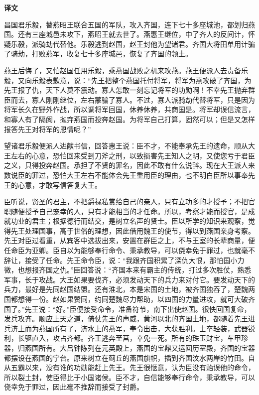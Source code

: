 \documentclass[12pt,UTF-8,openany,a4]{ctexbook}
\begin{document}
\newpage

\begin{Large}
    \noindent\textbf{译文}
\end{Large}


\vspace{1em}

\begin{large}
    \yiwen 
    昌国君乐毅，替燕昭王联合五国的军队，攻入齐国，连下七十多座城池，都划归燕国。还有三座城邑未攻下，燕昭王就去世了。燕惠王继位，中了齐人的反间计，怀疑乐毅，派骑劫代替他。乐毅逃到赵国，赵王封他为望诸君。齐国大将田单用计骗了骑劫，打败燕军，收复七十多座城邑，恢复了齐国的领土。
    
    燕王后悔了，又怕赵国任用乐毅，乘燕国战败之机来攻燕。燕王便派人去责备乐毅，又向乐毅表歉意，说：“先王把整个燕国托付将军，将军为燕攻破了齐国，为先王报了仇，天下人莫不震动。寡人怎敢一刻忘记将军的功勋啊！不幸先王抛弃群臣而去，寡人刚刚继位，左右蒙骗了寡人。不过，寡人派骑劫代替将军，只是因为将军长久在野外作战，所以调将军回国，休养休养，共商国是。将军却误信流言，和寡人有了隔阂，抛弃燕国而投奔赵国。为将军自己打算，固然可以；但是又怎样报答先王对将军的恩情呢？”
    
    望诸君乐毅便派人进献书信，回答惠王说：臣不才，不能奉承先王的遗命，顺从大王左右的心意，恐怕回来受到刀斧之刑，以致损害先王知人之明，又使您亏于君臣之义，只得投奔赵国。承担了不贤的罪名，因此不敢有什么说辞。现在大王派人来数说臣的罪过，恐怕大王左右不能体会先王重用臣的理由，也不明白臣所以事奉先王的心意，才敢写信答复大王。
    
    臣听说，贤圣的君主，不把爵禄私赏给自己的亲人，只有立功多的才授予；不把官职随便授予自己宠幸的人，只有才能相当的才任命。所以，考察才能而授官，是成就功业的君主；根据德行而结交，是树立名声的贤士。臣以所学的知识来观察，觉得先王处理国事，高于世俗的理想，因此借用魏王的使节，得以到燕国亲身考察。先王对臣过看重，从宾客中选拔出来，安置在群臣之上，不与王室的长辈商量，便任命臣为亚卿。臣自以为能够奉行命令、秉承教导，可以侥幸免于罪过，也就毫不辞让，接受了任命。先王命令臣，说：“我跟齐国积累了深仇大恨，那怕国小力微，也想报齐国之仇。”臣回答说：“齐国本来有霸主的传统，打过多次胜仗，熟悉军事，长于攻战。大王如果要伐齐，必须发动天下的兵力来对付它。要发动天下的兵力，最好是先同赵国结盟。还有淮北，本是宋国的土地，被齐国独吞了，楚魏两国都想得一份。赵如果赞同，约同楚魏尽力帮助，以四国的力量进攻，就可大破齐国了。”先王说：“好。”臣便接受命令，准备符节，南下出使赵国。很快回国复命，发兵攻齐。顺应上天之道，倚仗先王的声威，黄河以北的齐国土地，都随着先王进兵济上而为燕国所有了，济水上的燕军，奉令出击，大获胜利。士卒轻装，武器锐利，长驱直入，攻占齐都。齐王逃奔至莒，幸免一死。所有的珠玉财宝，车甲珍器，归燕国所有。大吕钟陈列在元英殿上，燕国的宝鼎又运回历室殿，齐国的宝器都摆设在燕国的宁台。原来树立在蓟丘的燕国旗帜，插到齐国汶水两岸的竹田。自从五霸以来，没有谁的功勋能赶上先王。先王很惬意，认为臣没有贻误他的命令，所以裂土封，使臣得比于小国诸侯。臣不才，自信能够奉行命令，秉承教导，可以侥幸免于罪过，因此毫不推辞而接受了封爵。
    

\end{large}
\end{document}
